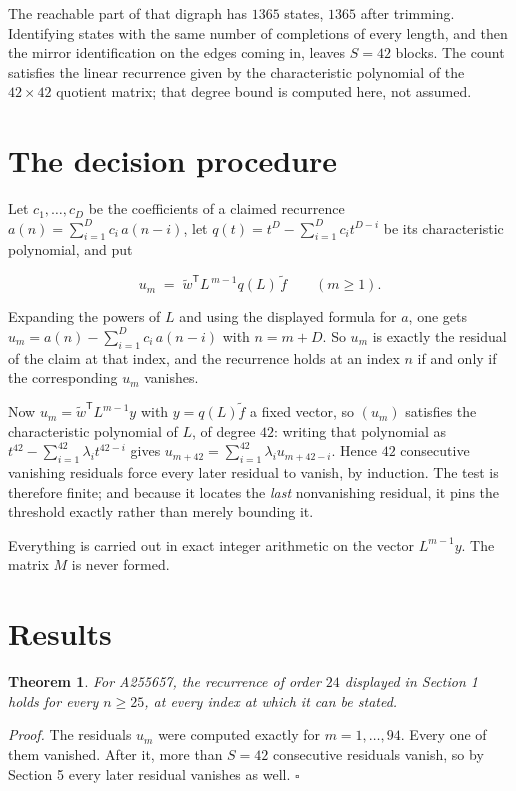 \documentclass[11pt]{article}
\newtheorem{theorem}{Theorem}
\theoremstyle{definition}
\begin{document}
The reachable part of that digraph has $1365$ states, $1365$ after trimming. Identifying states with the same number of completions of every length, and then the mirror identification on the edges coming in, leaves $S = 42$ blocks. The count satisfies the linear recurrence given by the characteristic polynomial of the $42\times42$ quotient matrix; that degree bound is computed here, not assumed.

\section{The decision procedure}

Let $c_1,\dots,c_D$ be the coefficients of a claimed recurrence $a(n) = \sum_{i=1}^{D} c_i\,a(n-i)$, let $q(t) = t^{D} - \sum_{i=1}^{D} c_i t^{D-i}$ be its characteristic polynomial, and put

\[u_m \;=\; \tilde w^{\mathsf T} L^{\,m-1} q(L)\,\tilde f \qquad (m \ge 1).\]

Expanding the powers of $L$ and using the displayed formula for $a$, one gets $u_m = a(n) - \sum_{i=1}^{D} c_i\,a(n-i)$ with $n = m + D$. So $u_m$ is exactly the residual of the claim at that index, and the recurrence holds at an index $n$ if and only if the corresponding $u_m$ vanishes.

Now $u_m = \tilde w^{\mathsf T} L^{m-1} y$ with $y = q(L)\tilde f$ a fixed vector, so $(u_m)$ satisfies the characteristic polynomial of $L$, of degree $42$: writing that polynomial as $t^{42} - \sum_{i=1}^{42} \lambda_i t^{42-i}$ gives $u_{m+42} = \sum_{i=1}^{42} \lambda_i u_{m+42-i}$. Hence $42$ consecutive vanishing residuals force every later residual to vanish, by induction. The test is therefore finite; and because it locates the {\itshape last} nonvanishing residual, it pins the threshold exactly rather than merely bounding it.

Everything is carried out in exact integer arithmetic on the vector $L^{m-1}y$. The matrix $M$ is never formed.

\section{Results}

\begin{theorem} For A255657, the recurrence of order $24$ displayed in Section 1 holds for every $n \ge 25$, at every index at which it can be stated.\end{theorem}

{\itshape Proof.} The residuals $u_m$ were computed exactly for $m = 1,\dots,94$. Every one of them vanished. After it, more than $S = 42$ consecutive residuals vanish, so by Section 5 every later residual vanishes as well. $\square$
\end{document}
